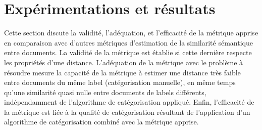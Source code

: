 
\section{Expérimentations et résultats}
\label{sec:similarite:experimentations}
Cette section discute la validité, l'adéquation, et l'efficacité de la métrique apprise en comparaison avec d'autres métriques d'estimation de la similarité sémantique entre documents. La validité de la métrique est établie si cette dernière respecte les propriétés d'une distance. L'adéquation de la métrique avec le problème à résoudre mesure la capacité de la métrique à estimer une distance très faible entre documents du même label (catégorisation manuelle), en même temps qu'une similarité quasi nulle entre documents de labels différents, indépendamment de l'algorithme de catégorisation appliqué. Enfin, l'efficacité de la métrique est liée à la qualité de catégorisation  résultant de l'application d'un algorithme de catégorisation  combiné avec la métrique apprise.


